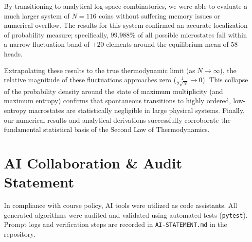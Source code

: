 \documentclass[11pt, a4paper]{article}
\begin{document}
By transitioning to analytical log-space combinatorics, we were able to evaluate a much larger system of $N = 116$ coins without suffering memory issues or numerical overflow. The results for this system confirmed an accurate localization of probability measure; specifically, $99.988\%$ of all possible microstates fall within a narrow fluctuation band of $\pm 20$ elements around the equilibrium mean of $58$ heads. 

Extrapolating these results to the true thermodynamic limit (as $N \to \infty$), the relative magnitude of these fluctuations approaches zero ($\frac{1}{2\sqrt{N}} \to 0$). This collapse of the probability density around the state of maximum multiplicity (and maximum entropy) confirms that spontaneous transitions to highly ordered, low-entropy macrostates are statistically negligible in large physical systems. Finally, our numerical results and analytical derivations successfully corroborate the fundamental statistical basis of the Second Law of Thermodynamics.

\appendix
\section{AI Collaboration \& Audit Statement}
In compliance with course policy, AI tools were utilized as code assistants. All generated algorithms were audited and validated using automated tests (\texttt{pytest}). Prompt logs and verification steps are recorded in \texttt{AI-STATEMENT.md} in the repository.
\end{document}
